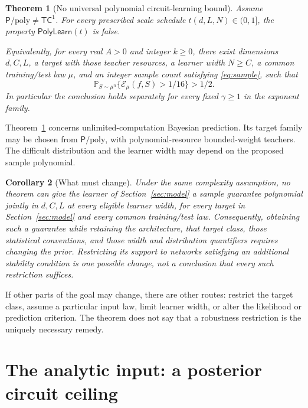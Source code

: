 \documentclass[11pt]{article}
\newtheorem{theorem}{Theorem}[section]
\newtheorem{corollary}[theorem]{Corollary}
\theoremstyle{remark}\newtheorem{remark}[theorem]{Remark}
\newcommand{\Pp}{\mathsf P/\mathrm{poly}}
\newcommand{\TC}{\mathsf{TC}}
\newcommand{\Prb}{\mathbb P}
\begin{document}
\begin{theorem}[No universal polynomial circuit-learning bound]
\label{thm:main}
Assume $\Pp\ne\TC^1$. For every prescribed scale schedule
$t(d,L,N)\in(0,1]$, the property $\mathsf{PolyLearn}(t)$ is false.

Equivalently, for every real $A>0$ and integer $k\ge0$, there exist dimensions
$d,C,L$, a target with those teacher resources, a learner width $N\ge C$,
a common training/test law $\mu$, and an integer sample count satisfying
\eqref{eq:sample}, such that
\begin{equation}\label{eq:failure}
 \Prb_{S\sim\mu^n}\{\mathcal E_\mu(f,S)>1/16\}>1/2.
\end{equation}
In particular the conclusion holds separately for every fixed
$\gamma\ge1$ in the exponent family.
\end{theorem}

Theorem~\ref{thm:main} concerns unlimited-computation Bayesian prediction.
Its target family may be chosen from $\Pp$, with polynomial-resource
bounded-weight teachers. The difficult distribution and the learner width
may depend on the proposed sample polynomial.

\begin{corollary}[What must change]\label{cor:change}
Under the same complexity assumption, no theorem can give the learner of Section~\ref{sec:model}
a sample guarantee polynomial jointly in $d,C,L$ at every
eligible learner width, for every target in Section~\ref{sec:model} and
every common training/test law.
Consequently, obtaining such a guarantee while retaining the architecture, that target
class, those statistical conventions, and those width and distribution
quantifiers requires changing the prior. Restricting its support to
networks satisfying an additional stability condition is one possible
change, not a conclusion that every such restriction suffices.
\end{corollary}

If other parts of the goal may change, there are other routes: restrict
the target class, assume a particular input law, limit learner width, or
alter the likelihood or prediction criterion. The theorem does not say
that a robustness restriction is the uniquely necessary remedy.

\section{The analytic input: a posterior circuit ceiling}
\label{sec:analytic}
\end{document}
